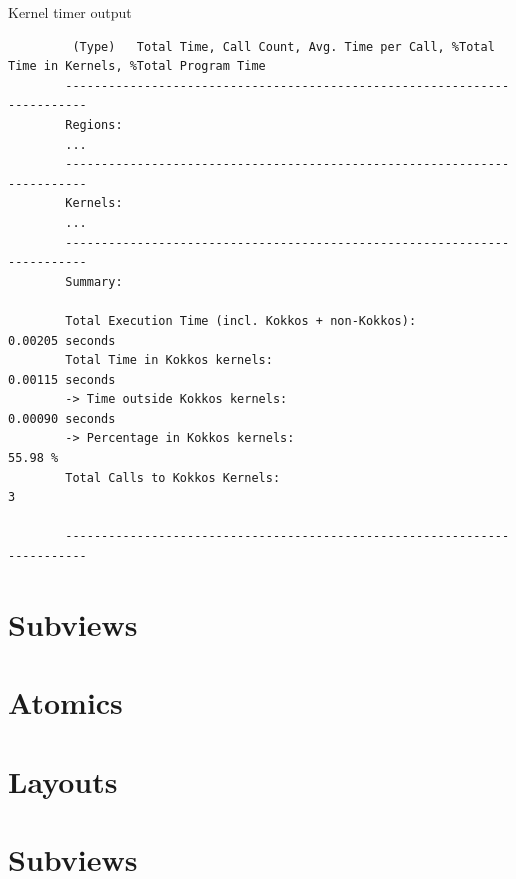 \documentclass[
    aspectratio=169,
    handout,
]{beamer}
\begin{document}
\begin{frame}[fragile]{Kernel timer output}
    \begin{verbatim}
         (Type)   Total Time, Call Count, Avg. Time per Call, %Total Time in Kernels, %Total Program Time
        -------------------------------------------------------------------------
        Regions:
        ...
        -------------------------------------------------------------------------
        Kernels:
        ...
        -------------------------------------------------------------------------
        Summary:

        Total Execution Time (incl. Kokkos + non-Kokkos):                   0.00205 seconds
        Total Time in Kokkos kernels:                                       0.00115 seconds
        -> Time outside Kokkos kernels:                                  0.00090 seconds
        -> Percentage in Kokkos kernels:                                   55.98 %
        Total Calls to Kokkos Kernels:                                            3

        -------------------------------------------------------------------------
    \end{verbatim}
\end{frame}


\section{Subviews}


\section{Atomics}


\section{Layouts}


\section{Subviews}
\end{document}
